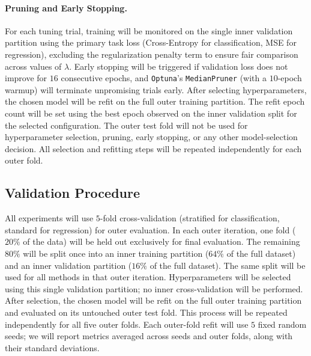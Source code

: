 \documentclass[11pt, a4paper]{article}
\begin{document}
\paragraph{Pruning and Early Stopping.}
For each tuning trial, training will be monitored on the single inner validation partition using the primary task loss (Cross-Entropy for classification, MSE for regression), excluding the regularization penalty term to ensure fair comparison across values of $\lambda$. Early stopping will be triggered if validation loss does not improve for $16$ consecutive epochs, and \texttt{Optuna}'s \texttt{MedianPruner} (with a $10$-epoch warmup) will terminate unpromising trials early. After selecting hyperparameters, the chosen model will be refit on the full outer training partition. The refit epoch count will be set using the best epoch observed on the inner validation split for the selected configuration. The outer test fold will not be used for hyperparameter selection, pruning, early stopping, or any other model-selection decision. All selection and refitting steps will be repeated independently for each outer fold.


\subsection{Validation Procedure}
All experiments will use $5$-fold cross-validation (stratified for classification, standard for regression) for outer evaluation. In each outer iteration, one fold ($20\%$ of the data) will be held out exclusively for final evaluation. The remaining $80\%$ will be split once into an inner training partition ($64\%$ of the full dataset) and an inner validation partition ($16\%$ of the full dataset). The same split will be used for all methods in that outer iteration. Hyperparameters will be selected using this single validation partition; no inner cross-validation will be performed. After selection, the chosen model will be refit on the full outer training partition and evaluated on its untouched outer test fold. This process will be repeated independently for all five outer folds. Each outer-fold refit will use $5$ fixed random seeds; we will report metrics averaged across seeds and outer folds, along with their standard deviations.
\end{document}
